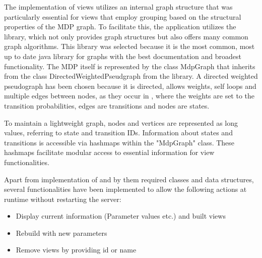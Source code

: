 \documentclass[preview]{standalone}
\begin{document}
The implementation of views utilizes an internal graph structure that was particularly essential for views that employ grouping based on the structural properties of the MDP graph. To facilitate this, the application utilizes the \jgrapht library, which not only provides graph structures but also offers many common graph algorithms. This library was selected because it is the most common, most up to date java library for graphs with the best documentation and broadest functionality. The MDP itself is represented by the class MdpGraph that inherits from the class DirectedWeightedPseudgraph from the \jgrapht library. A directed weighted pseudograph has been chosen because it is directed, allows weights, self loops and multiple edges between nodes, as they occur in \chgphsN, where the weights are set to the transition probabilities, edges are transitions and nodes are states.

To maintain a lightweight graph, nodes and vertices are represented as long values, referring to state and transition IDs. Information about states and transitions is accessible via hashmaps within the "MdpGraph" class. These hashmaps facilitate modular access to essential information for view functionalities.

Apart from implementation of \viewsN and by them required classes and data structures, several functionalities have been implemented to allow the following actions at runtime without restarting the server:
\begin{itemize}
	\item Display current \viewN information (Parameter values etc.) and built views
	\item Rebuild \viewN with new parameters
	\item Remove views by providing id or name		
\end{itemize}
\end{document}
